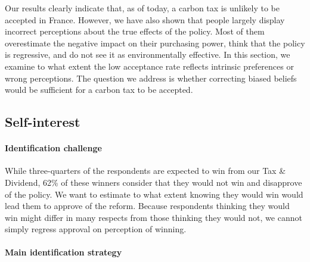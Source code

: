 \documentclass[11pt]{article}
\begin{document}
Our results clearly indicate that, as of today, a carbon tax is unlikely to be accepted in France. However, we have also shown that people largely display incorrect perceptions about the true effects of the policy. Most of them overestimate the negative impact on their purchasing power, think that the policy is regressive, and do not see it as environmentally effective. In this section, we examine to what extent the low acceptance rate reflects intrinsic preferences or wrong perceptions. The question we address is whether correcting biased beliefs would be sufficient for a carbon tax to be accepted. 

    \subsection{Self-interest}

\paragraph{Identification challenge}

While three-quarters of the respondents are expected to win from our Tax \& Dividend, 62\% of these winners consider that they would not win and disapprove of the policy. We want to estimate to what extent knowing they would win would lead them to approve of the reform. Because respondents thinking they would win might differ in many respects from those thinking they would not, we cannot simply regress approval on perception of winning. 


\paragraph{Main identification strategy}
\end{document}
